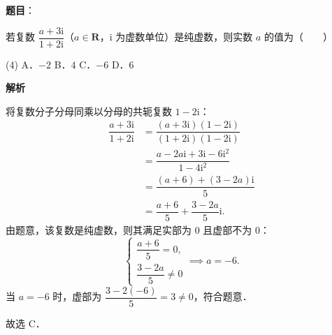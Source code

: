 \begin{answer}

\textbf{题目}：

若复数 $\dfrac{a+3\mathrm{i}}{1+2\mathrm{i}}$（$a \in \mathbf{R}$，$\mathrm{i}$ 为虚数单位）是纯虚数，则实数 $a$ 的值为\mbox{（　　）}

\begin{gkopts}(4)
\task A．$-2$
\task B．$4$
\task C．$-6$
\task D．$6$
\end{gkopts}

\textbf{解析}

将复数分子分母同乘以分母的共轭复数 $1 - 2\mathrm{i}$：
\nopagebreak[4]
\[
\begin{aligned}
\dfrac{a+3\mathrm{i}}{1+2\mathrm{i}} &= \dfrac{(a+3\mathrm{i})(1-2\mathrm{i})}{(1+2\mathrm{i})(1-2\mathrm{i})} \\
&= \dfrac{a - 2a\mathrm{i} + 3\mathrm{i} - 6\mathrm{i}^2}{1 - 4\mathrm{i}^2} \\
&= \dfrac{(a+6) + (3-2a)\mathrm{i}}{5} \\
&= \dfrac{a+6}{5} + \dfrac{3-2a}{5}\mathrm{i}.
\end{aligned}
\]
由题意，该复数是纯虚数，则其满足实部为 $0$ 且虚部不为 $0$：
\nopagebreak[4]
\[
\begin{cases} \dfrac{a+6}{5} = 0, \\ \dfrac{3-2a}{5} \neq 0 \end{cases} \implies a = -6.
\]
当 $a = -6$ 时，虚部为 $\dfrac{3 - 2(-6)}{5} = 3 \neq 0$，符合题意．

故选 C．


\end{answer}

